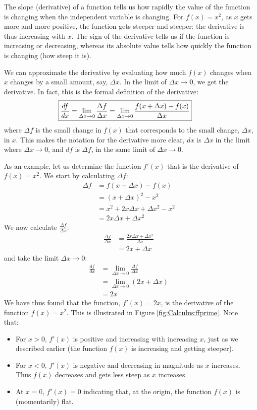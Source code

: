 The slope (derivative) of a function tells us how rapidly the value of the function is changing when the independent variable is changing. For $f(x)=x^2$, as $x$ gets more and more positive, the function gets steeper and steeper; the derivative is thus increasing with $x$. The sign of the derivative tells us if the function is increasing or decreasing, whereas its absolute value tells how quickly the function is changing (how steep it is).

We can approximate the derivative by evaluating how much $f(x)$ changes when $x$ changes by a small amount, say, $\Delta x$. In the limit of $\Delta x\to 0$, we get the derivative. In fact, this is the formal definition of the derivative: 
\begin{align}
\label{eqn:Calculus:derdef}
\Aboxed{\frac{df}{dx}=\lim_{\Delta x\to 0}\frac{\Delta f}{\Delta x} =\lim_{\Delta x\to 0}\frac{f(x+\Delta x)-f(x)}{\Delta x} }
\end{align}
where $\Delta f$ is the small change in $f(x)$ that corresponds to the small change, $\Delta x$, in $x$. This makes the notation for the derivative more clear, $dx$ is $\Delta x$ in the limit where $\Delta x\to0$, and $df$ is $\Delta f$, in the same limit of $\Delta x\to 0$.

As an example, let us determine the function $f'(x)$ that is the derivative of $f(x)=x^2$. We start by calculating $\Delta f$:
\begin{align*}
\Delta f &= f(x+\Delta x)-f(x)\\
&=(x+\Delta x)^2 - x^2\\
&=x^2+2x\Delta x+\Delta x^2 -x^2\\
&=2x\Delta x+\Delta x^2
\end{align*}
We now calculate $\frac{\Delta f}{\Delta x}$:
\begin{align*}
\frac{\Delta f}{\Delta x}&=\frac{2x\Delta x+\Delta x^2}{\Delta x}\\
&=2x+\Delta x
\end{align*}
and take the limit $\Delta x\to 0$:
\begin{align*}
\frac{df}{dx}&=\lim_{\Delta x\to 0 }\frac{\Delta f}{\Delta x}\\
&=\lim_{\Delta x\to 0 }(2x+\Delta x)\\
&=2x
\end{align*}
We have thus found that the function, $f'(x)=2x$, is the derivative of the function $f(x)=x^2$. This is illustrated in Figure \ref{fig:Calculus:ffprime}. Note that:
\begin{itemize}
\item For $x>0$, $f'(x)$ is positive and increasing with increasing $x$, just as we described earlier (the function $f(x)$ is increasing and getting steeper).
\item For $x<0$, $f'(x)$ is negative and decreasing in magnitude as $x$ increases. Thus $f(x)$ decreases and gets less steep as $x$ increases.
\item At $x=0$, $f'(x)=0$ indicating that, at the origin, the function $f(x)$ is (momentarily) flat.
\end{itemize}   

